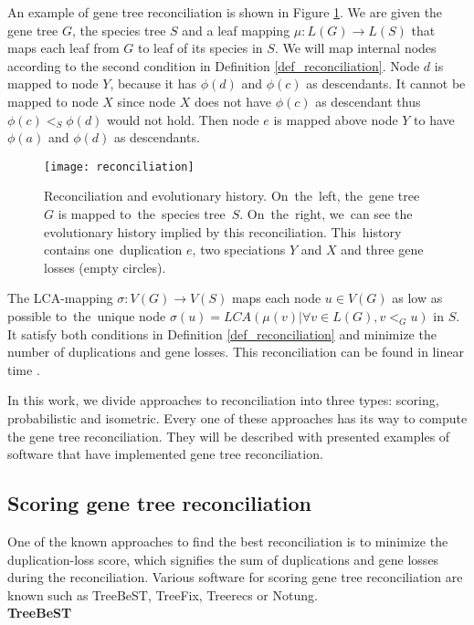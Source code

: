 An example of gene tree reconciliation is shown in Figure \ref{reconciliation}. We are given the gene tree $G$, the species tree $S$ and a leaf mapping $\mu: L(G) \rightarrow L(S)$ that maps each leaf from $G$ to leaf of its species in $S$. We will map internal nodes according to the second condition in Definition \ref{def_reconciliation}. Node $d$ is mapped to node $Y$, because it has $\phi(d)$ and $\phi(c)$ as descendants. It cannot be mapped to node $X$ since node $X$ does not have $\phi(c)$ as descendant thus $\phi(c)<_S\phi(d)$ would not hold. Then node $e$ is mapped above node $Y$ to have $\phi(a)$ and $\phi(d)$ as descendants. 

\begin{figure}[ht]
	\centering
	\label{reconciliation}
  	\texttt{[image: reconciliation]}
  	\caption[Reconciliation and evolutionary history]{Reconciliation and evolutionary history. On~the~left, the~gene tree~$G$ is mapped to~the~species tree~$S$. On~the~right, we~can see the evolutionary history implied by this reconciliation. This~history contains one~duplication $e$, two speciations $Y$ and $X$ and three gene losses (empty circles).}
\end{figure}

The LCA-mapping $\sigma: V(G) \rightarrow V(S)$ maps each node $u \in V(G)$ as low as possible to~the~unique node $\sigma(u) = LCA(\mu(v) | \forall v \in L(G), v<_Gu)$ in $S$. It satisfy both conditions in Definition \ref{def_reconciliation} and minimize the number of duplications and gene losses. This reconciliation can be found in linear time \cite{hasic}.

In this work, we divide approaches to reconciliation into three types: scoring, probabilistic and isometric. Every one of these approaches has its way to compute the gene tree reconciliation. They will be described with presented examples of software that have implemented gene tree reconciliation. 

\subsection{Scoring gene tree reconciliation}
One of the known approaches to find the best reconciliation is to minimize the duplication-loss score, which signifies the sum of duplications and gene losses during the reconciliation. Various software for scoring gene tree reconciliation are known such as TreeBeST, TreeFix, Treerecs or Notung.\\
\textbf{TreeBeST} 

